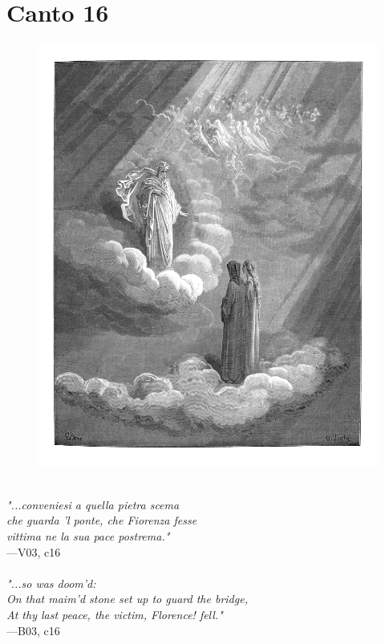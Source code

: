 \documentclass[../Dore_vision.tex]{subfiles}
\begin{document}
\newpage

\section{Canto 16}

\begin{figure}[ht]
\centering
\includegraphics[height=\figsize]{illustrations/book_3/V03, c16.jpg}
\end{figure}

\begin{center}
\begin{minipage}{0.8\linewidth}
\textit{\\
"...conveniesi a quella pietra scema\\che guarda ’l ponte, che Fiorenza fesse\\vittima ne la sua pace postrema."} \\
—V03, c16 \\~\\
\textit{"...so was doom'd:\\On that maim'd stone set up to guard the bridge,\\At thy last peace, the victim, Florence! fell."} \\
—B03, c16
\end{minipage}
\end{center}
\end{document}
